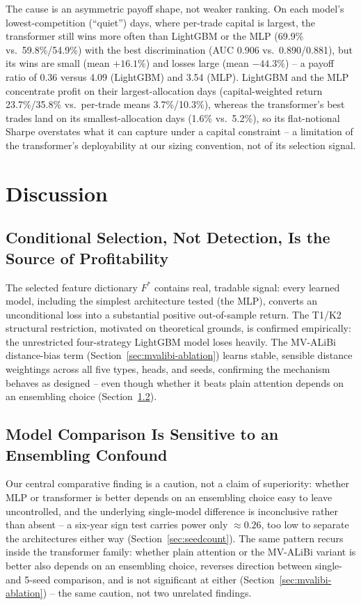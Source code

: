 \documentclass[sigconf,review,anonymous]{acmart}
\begin{document}
The cause is an asymmetric payoff shape, not weaker ranking. On each model's lowest-competition (``quiet'') days, where per-trade capital is largest, the transformer still wins more often than LightGBM or the MLP (69.9\% vs.\ 59.8\%/54.9\%) with the best discrimination (AUC 0.906 vs.\ 0.890/0.881), but its wins are small (mean $+16.1\%$) and losses large (mean $-44.3\%$) -- a payoff ratio of 0.36 versus 4.09 (LightGBM) and 3.54 (MLP). LightGBM and the MLP concentrate profit on their largest-allocation days (capital-weighted return 23.7\%/35.8\% vs.\ per-trade means 3.7\%/10.3\%), whereas the transformer's best trades land on its smallest-allocation days (1.6\% vs.\ 5.2\%), so its flat-notional Sharpe overstates what it can capture under a capital constraint -- a limitation of the transformer's deployability at our sizing convention, not of its selection signal.

\section{Discussion}
\label{sec:discussion}

\subsection{Conditional Selection, Not Detection, Is the Source of Profitability}
The selected feature dictionary $F^{\ast}$ contains real, tradable signal: every learned model, including the simplest architecture tested (the MLP), converts an unconditional loss into a substantial positive out-of-sample return. The T1/K2 structural restriction, motivated on theoretical grounds, is confirmed empirically: the unrestricted four-strategy LightGBM model loses heavily. The MV-ALiBi distance-bias term (Section~\ref{sec:mvalibi-ablation}) learns stable, sensible distance weightings across all five types, heads, and seeds, confirming the mechanism behaves as designed -- even though whether it beats plain attention depends on an ensembling choice (Section~\ref{sec:ensembling-discussion}).

\subsection{Model Comparison Is Sensitive to an Ensembling Confound}
\label{sec:ensembling-discussion}
Our central comparative finding is a caution, not a claim of superiority: whether MLP or transformer is better depends on an ensembling choice easy to leave uncontrolled, and the underlying single-model difference is inconclusive rather than absent -- a six-year sign test carries power only $\approx0.26$, too low to separate the architectures either way (Section~\ref{sec:seedcount}). The same pattern recurs inside the transformer family: whether plain attention or the MV-ALiBi variant is better also depends on an ensembling choice, reverses direction between single- and 5-seed comparison, and is not significant at either (Section~\ref{sec:mvalibi-ablation}) -- the same caution, not two unrelated findings.
\end{document}
